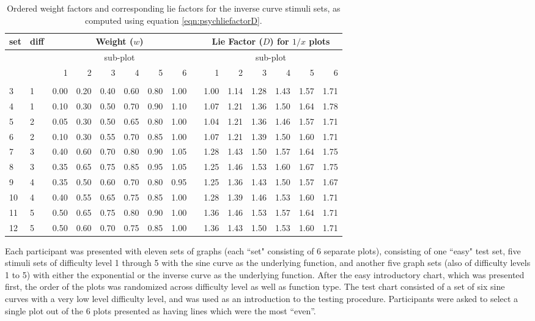 \documentclass[11pt]{isuthesis}\usepackage[]{graphicx}\usepackage[]{color}
\begin{document}
\begin{table}[ht]
\centering
\caption[Weight factor and lie factors for inverse stimuli]{\label{tab:w3} Ordered weight factors and corresponding lie factors for the inverse curve stimuli sets, as computed using equation \ref{eqn:psychliefactorD}. 
}
     \begin{tabular}{llrrrrrrlrrrrrr}
     \hline
     set\vphantom{hp}& diff & \multicolumn{6}{c}{Weight ($w$)} & & \multicolumn{6}{c}{Lie Factor ($D$) for $1/x$ plots}\\ 
     \hline
     & & \multicolumn{6}{c}{sub-plot} & & \multicolumn{6}{c}{sub-plot}\\ 
     & & 1 & 2 & 3 & 4 & 5 & 6  & & 1 & 2 & 3 & 4 & 5 & 6  \\ 
     \cline{3-8} \cline{10-15}\\ [-1.75ex]
     3 & 1 & 0.00 & 0.20 & 0.40 & 0.60 & 0.80 & 1.00 &  & 1.00 & 1.14 & 1.28 & 1.43 & 1.57 & 1.71 \\ 
     4 & 1 & 0.10 & 0.30 & 0.50 & 0.70 & 0.90 & 1.10 &  & 1.07 & 1.21 & 1.36 & 1.50 & 1.64 & 1.78 \\ 
     5 & 2 & 0.05 & 0.30 & 0.50 & 0.65 & 0.80 & 1.00 &  & 1.04 & 1.21 & 1.36 & 1.46 & 1.57 & 1.71 \\ 
     6 & 2 & 0.10 & 0.30 & 0.55 & 0.70 & 0.85 & 1.00 &  & 1.07 & 1.21 & 1.39 & 1.50 & 1.60 & 1.71 \\ 
     7 & 3 & 0.40 & 0.60 & 0.70 & 0.80 & 0.90 & 1.05 &  & 1.28 & 1.43 & 1.50 & 1.57 & 1.64 & 1.75 \\ 
     8 & 3 & 0.35 & 0.65 & 0.75 & 0.85 & 0.95 & 1.05 &  & 1.25 & 1.46 & 1.53 & 1.60 & 1.67 & 1.75 \\ 
     9 & 4 & 0.35 & 0.50 & 0.60 & 0.70 & 0.80 & 0.95 &  & 1.25 & 1.36 & 1.43 & 1.50 & 1.57 & 1.67 \\ 
     10 & 4 & 0.40 & 0.55 & 0.65 & 0.75 & 0.85 & 1.00 &  & 1.28 & 1.39 & 1.46 & 1.53 & 1.60 & 1.71 \\ 
     11 & 5 & 0.50 & 0.65 & 0.75 & 0.80 & 0.90 & 1.00 &  & 1.36 & 1.46 & 1.53 & 1.57 & 1.64 & 1.71 \\ 
     12 & 5 & 0.50 & 0.60 & 0.70 & 0.75 & 0.85 & 1.00 &  & 1.36 & 1.43 & 1.50 & 1.53 & 1.60 & 1.71 \\ 
     \hline
     \end{tabular}
\end{table}

Each participant was presented with eleven sets of graphs (each ``set" consisting of 6 separate plots), consisting of one ``easy" test set, five stimuli sets of difficulty level 1 through 5 with the sine curve as the underlying function, and another five graph sets (also of difficulty levels 1 to 5) with either the exponential or the inverse curve as the underlying function. After the easy introductory chart, which was presented first, the order of the plots was randomized across difficulty level as well as function type. The test chart consisted of a set of six sine curves with a very low level difficulty level, and was used as an introduction to the testing procedure. Participants were asked to select a single plot out of the 6 plots presented as having lines which were the most ``even''. 
\end{document}
